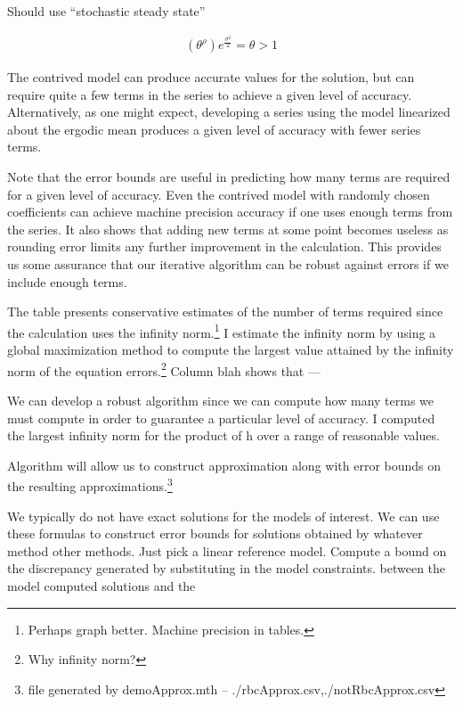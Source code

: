 \documentclass[12pt]{article}
\begin{document}
Should use ``stochastic steady  state''

\begin{gather}
 (\theta^\rho)e^{\frac{\sigma^2}{2}}=\theta > 1
\end{gather}

The contrived model can produce accurate values for the solution, but can require quite a few terms in the series to achieve a given level of accuracy. 
 Alternatively, as one might expect, developing 
a series using the model linearized about the ergodic mean produces a given
level of accuracy with 
fewer series terms.  

Note that the error bounds are useful in predicting how many terms are required for a given level of accuracy. Even the contrived model with randomly chosen
coefficients can achieve machine precision accuracy if one uses enough
terms from the series.  It also shows that adding new terms at some point becomes useless as rounding error limits any further improvement in the calculation.
This provides us some assurance that our iterative algorithm can be robust 
against errors if we include enough terms.

The table presents conservative estimates of the number of terms required
since the calculation uses the infinity norm.\footnote{Perhaps graph better.  Machine precision in tables.}  I estimate the infinity
norm by using a global maximization method to compute the largest value
attained by the infinity norm of the equation errors.\footnote{Why infinity norm?}  Column  blah shows that --- 

We can develop a robust algorithm since we can compute how many terms
we must compute in order to guarantee a particular level of accuracy.
I computed the largest infinity norm for the product of h over a range of
reasonable values.  

Algorithm will allow us to construct approximation along with error bounds on the resulting approximations.\footnote{file generated by demoApprox.mth -- {./rbcApprox.csv,./notRbcApprox.csv}}


We typically do not have exact solutions for the models of interest.
We can use these formulas to construct error bounds for solutions obtained by 
whatever method other methods.
Just pick a linear reference model.  Compute a bound on the discrepancy 
generated by substituting in the model constraints. between the model computed solutions and the 

\end{document}
